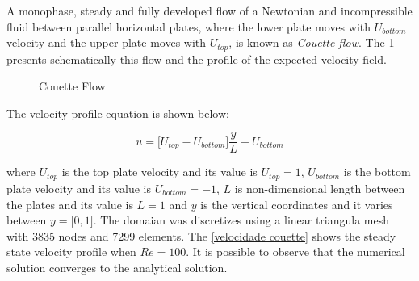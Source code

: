 A monophase, steady and fully developed flow of a 
Newtonian and incompressible fluid between parallel horizontal 
plates, where the lower plate moves with \textit{$U_{bottom}$} 
velocity and the upper plate moves with \textit{$ U_{top}$}, 
is known as \textit{Couette flow}. The \ref{couette}
 presents schematically this flow and the profile of the expected velocity field.

\begin{figure}[H]
\caption{Couette Flow}
\begin{center}
\end{center}
\label{couette}
\end{figure}


\noindent
The velocity profile equation is shown below:

\begin{equation}
 u = \big[ U_{top} - U_{bottom} \big] \frac{y}{L} + U_{bottom}
\end{equation}

\medskip
\noindent
where $U_{top}$ is the top plate velocity and its value is
$U_{top} = 1$, 
$U_{bottom}$ is the bottom plate velocity and its value is
$U_{bottom} = -1$, 
$L$ is non-dimensional length
between the plates and its value is $L = 1$
and $y$ is the vertical coordinates and it varies between 
$y = \big[ 0,1 \big]$.
The domaian was discretizes using a linear triangula mesh with 
3835 nodes and 7299 elements. 
The \ref{velocidade couette} shows the steady state velocity profile
when $Re=100$.
It is possible to observe that the numerical solution 
converges to the analytical solution.

